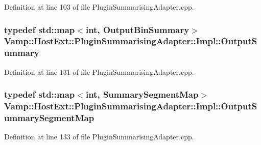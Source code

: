 Definition at line 103 of file Plugin\+Summarising\+Adapter.\+cpp.

\subsubsection[{\texorpdfstring{Output\+Summary}{OutputSummary}}]{\setlength{\rightskip}{0pt plus 5cm}typedef {\bf std\+::map}$<${\bf int}, {\bf Output\+Bin\+Summary}$>$ {\bf Vamp\+::\+Host\+Ext\+::\+Plugin\+Summarising\+Adapter\+::\+Impl\+::\+Output\+Summary}\hspace{0.3cm}{\ttfamily [protected]}}\hypertarget{class_vamp_1_1_host_ext_1_1_plugin_summarising_adapter_1_1_impl_a399054ba35d2ac0cd96c720d2fc90c1b}{}\label{class_vamp_1_1_host_ext_1_1_plugin_summarising_adapter_1_1_impl_a399054ba35d2ac0cd96c720d2fc90c1b}


Definition at line 131 of file Plugin\+Summarising\+Adapter.\+cpp.

\subsubsection[{\texorpdfstring{Output\+Summary\+Segment\+Map}{OutputSummarySegmentMap}}]{\setlength{\rightskip}{0pt plus 5cm}typedef {\bf std\+::map}$<${\bf int}, {\bf Summary\+Segment\+Map}$>$ {\bf Vamp\+::\+Host\+Ext\+::\+Plugin\+Summarising\+Adapter\+::\+Impl\+::\+Output\+Summary\+Segment\+Map}\hspace{0.3cm}{\ttfamily [protected]}}\hypertarget{class_vamp_1_1_host_ext_1_1_plugin_summarising_adapter_1_1_impl_a6c95c2005205834e54eb1f3c671205c3}{}\label{class_vamp_1_1_host_ext_1_1_plugin_summarising_adapter_1_1_impl_a6c95c2005205834e54eb1f3c671205c3}


Definition at line 133 of file Plugin\+Summarising\+Adapter.\+cpp.

